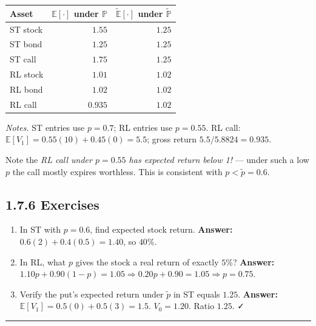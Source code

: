 \documentclass[
  10pt,
  twoside]{book}
\newcounter{none} %
\providecommand{\tightlist}{%
  \setlength{\itemsep}{0pt}\setlength{\parskip}{0pt}}
\begin{document}
{\def\LTcaptype{none} %
\begin{table}[H]
\centering
\begin{tabular}{|l|r|r|}
\toprule
Asset & \(\mathbb E[\cdot]\) under \(\mathbb P\) & \(\widetilde{\mathbb E}[\cdot]\) under \(\tilde{\mathbb P}\) \\
\midrule



ST stock & \(1.55\) & \(1.25\) \\
ST bond & \(1.25\) & \(1.25\) \\
ST call & \(1.75\) & \(1.25\) \\
RL stock & \(1.01\) & \(1.02\) \\
RL bond & \(1.02\) & \(1.02\) \\
RL call & \(0.935\) & \(1.02\) \\
\bottomrule
\end{tabular}
\end{table}
}

\emph{Notes.} ST entries use \(p=0.7\); RL entries use \(p=0.55\). RL
call: \(\mathbb E[V_1] = 0.55(10) + 0.45(0) = 5.5\); gross return
\(5.5/5.8824 = 0.935\).

Note the \emph{RL call under \(p=0.55\) has expected return below 1!}
--- under such a low \(p\) the call mostly expires worthless. This is
consistent with \(p<\tilde p=0.6\).

\subsection{1.7.6 Exercises}\label{exercises-17}

\begin{enumerate}
\def\labelenumi{\arabic{enumi}.}
\tightlist
\item
  In ST with \(p=0.6\), find expected stock return. \textbf{Answer:}
  \(0.6(2)+0.4(0.5)=1.40\), so \(40\%\).
\item
  In RL, what \(p\) gives the stock a real return of exactly \(5\%\)?
  \textbf{Answer:}
  \(1.10p+0.90(1-p)=1.05 \Rightarrow 0.20p+0.90=1.05 \Rightarrow p=0.75\).
\item
  Verify the put's expected return under \(\tilde p\) in ST equals
  \(1.25\). \textbf{Answer:} \(\mathbb E[V_1]=0.5(0)+0.5(3)=1.5\).
  \(V_0=1.20\). Ratio \(1.25\). ✓
\end{enumerate}

\begin{center}\rule{0.5\linewidth}{0.5pt}\end{center}
\end{document}
